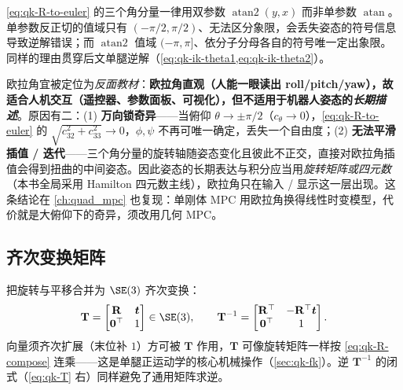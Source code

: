 \begin{note}\label{note:qk-ocr-atan2}
\cref{eq:qk-R-to-euler} 的三个角分量一律用双参数 $\operatorname{atan2}(y,x)$ 而非单参数 $\operatorname{atan}$。单参数反正切的值域只有 $(-\pi/2,\pi/2)$、无法区分象限，会丢失姿态的符号信息导致逆解错误；而 $\operatorname{atan2}$ 值域 $(-\pi,\pi]$、依分子分母各自的符号唯一定出象限。同样的理由贯穿后文单腿逆解（\cref{eq:qk-ik-theta1,eq:qk-ik-theta2}）。
\end{note}

\begin{insight}\label{ins:qk-euler-only-hmi}
欧拉角宜被定位为\emph{反面教材}：\textbf{欧拉角直观（人能一眼读出 roll/pitch/yaw），故适合人机交互（遥控器、参数面板、可视化），但不适用于机器人姿态的\emph{长期描述}}。原因有二：(1) \textbf{万向锁奇异}——当俯仰 $\theta\to\pm\pi/2$（$c_\theta\to0$），\cref{eq:qk-R-to-euler} 的 $\sqrt{c_{32}^2+c_{33}^2}\to0$，$\phi,\psi$ 不再可唯一确定，丢失一个自由度；(2) \textbf{无法平滑插值 / 迭代}——三个角分量的旋转轴随姿态变化且彼此不正交，直接对欧拉角插值会得到扭曲的中间姿态。因此姿态的长期表达与积分应当用\emph{旋转矩阵或四元数}（本书全局采用 Hamilton 四元数主线），欧拉角只在输入 / 显示这一层出现。这条结论在 \cref{ch:quad_mpc} 也复现：单刚体 MPC 用欧拉角换得线性时变模型，代价就是大俯仰下的奇异，须改用几何 MPC。
\end{insight}

\subsection{齐次变换矩阵}
\label{subsec:qk-se3}

把旋转与平移合并为 $\SE(3)$ 齐次变换\cite{unitree2023quadruped}：
\begin{equation}
  \mathbf{T}=\begin{bmatrix}\mathbf{R}&\boldsymbol{t}\\\mathbf{0}^\top&1\end{bmatrix}\in\SE(3),
  \qquad
  \mathbf{T}^{-1}=\begin{bmatrix}\mathbf{R}^\top&-\mathbf{R}^\top\boldsymbol{t}\\\mathbf{0}^\top&1\end{bmatrix}.
  \label{eq:qk-T}
\end{equation}
向量须齐次扩展（末位补 $1$）方可被 $\mathbf{T}$ 作用，$\mathbf{T}$ 可像旋转矩阵一样按 \cref{eq:qk-R-compose} 连乘——这是单腿正运动学的核心机械操作（\cref{sec:qk-fk}）。逆 $\mathbf{T}^{-1}$ 的闭式（\cref{eq:qk-T} 右）同样避免了通用矩阵求逆。

